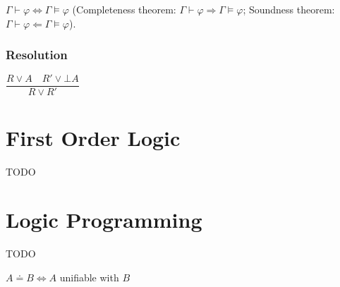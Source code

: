 \documentclass[]{article}
\begin{document}
\noindent $\Gamma \vdash \varphi \iff \Gamma \vDash \varphi$ (Completeness theorem: $\Gamma \vdash \varphi \Rightarrow \Gamma \vDash \varphi$; Soundness theorem: $\Gamma \vdash \varphi \Leftarrow \Gamma \vDash \varphi$).

\subsubsection{Resolution}


\noindent $\dfrac{R \lor A \hspace{1em} R' \lor \bot A}{R \lor R'}$

\section{First Order Logic}

TODO

\section{Logic Programming}

TODO

$ A \doteq B \Leftrightarrow A $ unifiable with $ B $
\end{document}
